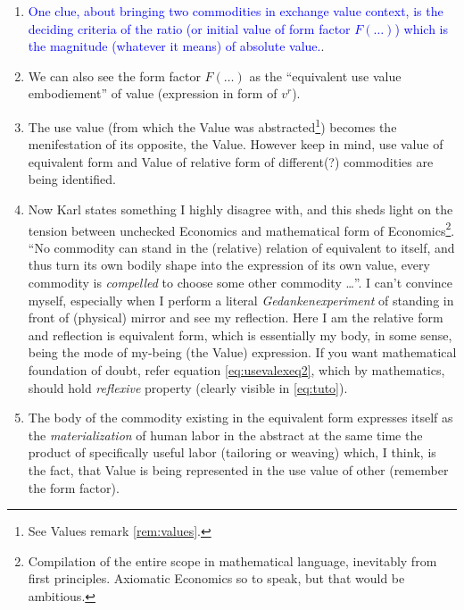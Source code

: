 \documentclass[12pt]{extarticle}
\theoremstyle{definition}
\newenvironment{remark}[1][Remark]{\begin{trivlist}
\item[\hskip \labelsep {\bfseries #1}]}{\end{trivlist}}
\begin{document}
\begin{remark}
\begin{enumerate}
   \item \textcolor{blue}{One clue, about bringing two commodities in exchange value context, is the deciding criteria of the ratio (or initial value of form factor $F(\ldots)$) which is the magnitude (whatever it means) of absolute value.}.
   \item We can also see the form factor $F(\ldots)$ as the ``equivalent use value embodiement'' of value (expression in form of $v^r$).
   \item \label{mark:usevalVal} The use value (from which the Value was abstracted\footnote{See Values remark \ref{rem:values}.}) becomes the menifestation of its opposite, the Value.  However keep in mind, use value of equivalent form and Value of relative form of different(?) commodities are being identified.
   \item \label{mark:reflexarg} Now Karl states something I highly disagree with, and this sheds light on the tension between unchecked Economics and mathematical form of Economics\footnote{Compilation of the entire scope in mathematical language, inevitably from first principles.  Axiomatic Economics so to speak, but that would be ambitious.}.  ``No commodity can stand in the (relative) relation of equivalent to itself, and thus turn its own bodily shape into the expression of its own value, every commodity is \emph{compelled} to choose some other commodity \ldots''.  I can't convince myself, especially when I perform a literal \emph{Gedankenexperiment} of standing in front of (physical) mirror and see my reflection.  Here I am the relative form and reflection is equivalent form, which is essentially my body, in some sense, being the mode of my-being (the Value) expression.  If you want mathematical foundation of doubt, refer equation \ref{eq:usevalexeq2}, which by mathematics, should hold \emph{reflexive} property (clearly visible in \ref{eq:tuto}).
   \item \label{mark:combod} The body of the commodity existing in the equivalent form expresses itself as the \emph{materialization} of human labor in the abstract at the same time the product of specifically useful labor (tailoring or weaving) which, I think, is the fact, that Value is being represented in the use value of other (remember the form factor).

\end{enumerate}
\end{remark}
\end{document}
